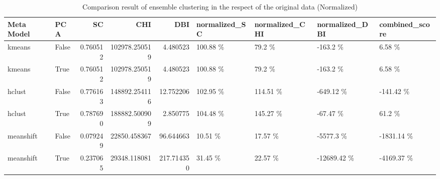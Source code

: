\begin{table}[t]
\centering
\caption{Comparison result of ensemble clustering in the respect of the original data (Normalized)}
\label{tbl:meta_clustering_score_results_respect_original_normalized}
\begin{tabular}{llrrrllll}
\toprule
Meta Model &   PCA &       SC &           CHI &        DBI & normalized_SC & normalized_CHI & normalized_DBI & combined_score \\
\midrule
    kmeans & False & 0.760512 & 102978.250519 &   4.480523 &     100.88 \% &        79.2 \% &      -163.2 \% &        6.58 \% \\
    kmeans &  True & 0.760512 & 102978.250519 &   4.480523 &     100.88 \% &        79.2 \% &      -163.2 \% &        6.58 \% \\
    hclust & False & 0.776163 & 148892.254116 &  12.752206 &     102.95 \% &      114.51 \% &     -649.12 \% &     -141.42 \% \\
    hclust &  True & 0.787690 & 188882.500909 &   2.850775 &     104.48 \% &      145.27 \% &      -67.47 \% &        61.2 \% \\
 meanshift & False & 0.079249 &  22850.458367 &  96.644663 &      10.51 \% &       17.57 \% &     -5577.3 \% &    -1831.14 \% \\
 meanshift &  True & 0.237065 &  29348.118081 & 217.714350 &      31.45 \% &       22.57 \% &   -12689.42 \% &    -4169.37 \% \\
\bottomrule
\end{tabular}
\end{table}
